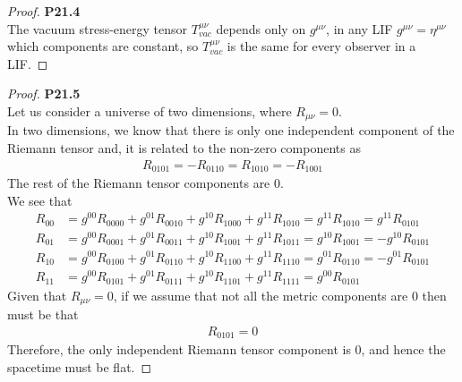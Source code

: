 \documentclass[11pt]{article}
\theoremstyle{definition}
\begin{document}
\cleardoublepage
\begin{proof}{\textbf{P21.4}}\\
The vacuum stress-energy tensor $T^{\mu\nu}_{vac}$ depends only on $g^{\mu\nu}$,
in any LIF $g^{\mu\nu} = \eta^{\mu\nu}$ which components are constant, so 
$T^{\mu\nu}_{vac}$ is the same for every observer in a LIF.
\end{proof}

\cleardoublepage
\begin{proof}{\textbf{P21.5}}\\
Let us consider a universe of two dimensions, where $R_{\mu\nu} = 0$.\\
In two dimensions, we know that there is only one independent component of the
Riemann tensor and, it is related to the non-zero components as
\begin{align*}
    R_{0101} = -R_{0110} = R_{1010} = -R_{1001}
\end{align*}
The rest of the Riemann tensor components are 0.\\
We see that
\begin{align*}
    R_{00} 
    &= g^{00} R_{0000} + g^{01} R_{0010} + g^{10} R_{1000} + g^{11} R_{1010}
    = g^{11} R_{1010} = g^{11} R_{0101} \\
    R_{01} 
    &= g^{00} R_{0001} + g^{01} R_{0011} + g^{10} R_{1001} + g^{11} R_{1011}
    = g^{10} R_{1001} = -g^{10} R_{0101} \\
    R_{10} 
    &= g^{00} R_{0100} + g^{01} R_{0110} + g^{10} R_{1100} + g^{11} R_{1110}
    = g^{01} R_{0110} = -g^{01} R_{0101} \\
    R_{11} 
    &= g^{00} R_{0101} + g^{01} R_{0111} + g^{10} R_{1101} + g^{11} R_{1111}
    = g^{00} R_{0101}
\end{align*}
Given that $R_{\mu\nu} = 0$, if we assume that not all the metric components
are 0 then must be that 
\begin{align*}
    R_{0101} = 0
\end{align*}
Therefore, the only independent Riemann tensor component is 0, and hence the
spacetime must be flat.
\end{proof}
\end{document}

